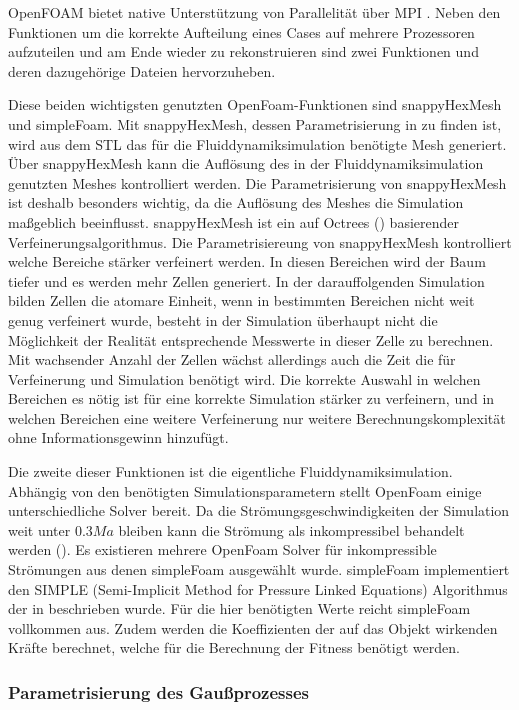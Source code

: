 OpenFOAM bietet native Unterstützung von Parallelität über MPI \cite{OpenMPI.}.
Neben den Funktionen um die korrekte Aufteilung eines Cases auf mehrere Prozessoren aufzuteilen und am Ende wieder zu rekonstruieren sind zwei Funktionen und deren dazugehörige Dateien hervorzuheben.

Diese beiden wichtigsten genutzten OpenFoam-Funktionen sind snappyHexMesh und simpleFoam.
Mit snappyHexMesh, dessen Parametrisierung in  zu finden ist, wird aus dem STL das für die Fluiddynamiksimulation benötigte Mesh generiert. Über snappyHexMesh kann die Auflösung des in der Fluiddynamiksimulation genutzten Meshes kontrolliert werden.
Die Parametrisierung von snappyHexMesh ist deshalb besonders wichtig, da die Auflösung des Meshes die Simulation maßgeblich beeinflusst.
snappyHexMesh ist ein auf Octrees (\cite{Meagher.1982}) basierender Verfeinerungsalgorithmus.
Die Parametrisiereung von snappyHexMesh kontrolliert welche Bereiche stärker verfeinert werden.
In diesen Bereichen wird der Baum tiefer und es werden mehr Zellen generiert.
In der darauffolgenden Simulation bilden Zellen die atomare Einheit, wenn in bestimmten Bereichen nicht weit genug verfeinert wurde, besteht in der Simulation überhaupt nicht die Möglichkeit der Realität entsprechende Messwerte in dieser Zelle zu berechnen.
Mit wachsender Anzahl der Zellen wächst allerdings auch die Zeit die für Verfeinerung und Simulation benötigt wird.
Die korrekte Auswahl in welchen Bereichen es nötig ist für eine korrekte Simulation stärker zu verfeinern, und in welchen Bereichen eine weitere Verfeinerung nur weitere Berechnungskomplexität ohne Informationsgewinn hinzufügt. 

Die zweite dieser Funktionen ist die eigentliche Fluiddynamiksimulation.
Abhängig von den benötigten Simulationsparametern stellt OpenFoam einige unterschiedliche Solver bereit.
Da die Strömungsgeschwindigkeiten der Simulation weit unter $0.3Ma$ bleiben kann die Strömung als inkompressibel behandelt werden (\cite{Anderson.2017}).
Es existieren mehrere OpenFoam Solver für inkompressible Strömungen aus denen simpleFoam ausgewählt wurde.
simpleFoam implementiert den SIMPLE (Semi-Implicit Method for Pressure Linked Equations) Algorithmus der in \cite{Caretto.1973} beschrieben wurde.
Für die hier benötigten Werte reicht simpleFoam vollkommen aus.
Zudem werden die Koeffizienten der auf das Objekt wirkenden Kräfte berechnet, welche für die Berechnung der Fitness benötigt werden. 

\subsubsection{Parametrisierung des Gaußprozesses}

